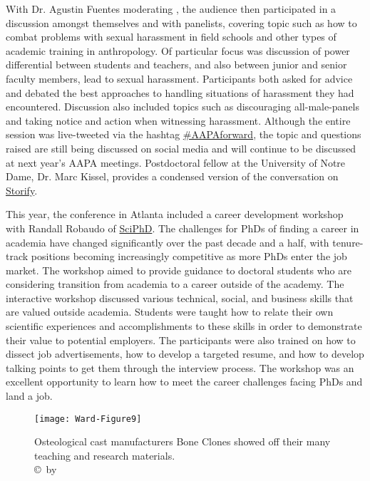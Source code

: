 With Dr. Agustin Fuentes moderating , the audience then participated in a discussion amongst themselves and with panelists,
covering topic such as how to combat problems with sexual harassment in field schools and 
other types of academic training in anthropology. 
Of particular focus was discussion of power differential between students and teachers,
and also between junior and senior faculty members, lead to sexual harassment. 
Participants both asked for advice and debated the best approaches to handling situations of harassment they had encountered.
Discussion also included topics such as discouraging all-male-panels and taking notice and action when witnessing harassment.
Although the entire session was live-tweeted via the hashtag \href{https://twitter.com/search?q=\%23AAPAforward\&src=typd}{\#AAPAforward},
the topic and questions raised are still being discussed on social media and will continue to
be discussed at next year’s AAPA meetings. 
Postdoctoral fellow at the University of Notre Dame, Dr. Marc Kissel, provides a condensed version of the conversation on \href{http://storify.com/MarcKissel/getting-started}{Storify}.

This year, the conference in Atlanta included a career development workshop with Randall Robaudo of \href{http://sciphd.com/}{SciPhD}.
The challenges for PhDs of finding a career in academia have changed significantly over the past decade and a half,
with tenure-track positions becoming increasingly competitive as more PhDs enter the job market. 
The workshop aimed to provide guidance to doctoral students who are considering transition from academia to
a career outside of the academy. 
The interactive workshop discussed various technical, social, and business skills that are valued outside academia.
Students were taught how to relate their own scientific experiences and accomplishments to these skills in order to
demonstrate their value to potential employers. 
The participants were also trained on how to dissect job advertisements, how to develop a targeted resume,
and how to develop talking points to get them through the interview process. 
The workshop was an excellent opportunity to learn how to meet the career challenges facing PhDs and land a job.

	\begin{figure}[!tb] %
		\centering
		\texttt{[image: Ward-Figure9]}
		\caption{Osteological cast manufacturers Bone Clones showed off their many teaching and research materials.
				{\normalfont\scriptsize \\ \copyright\ by \authortwo}}
		\label{fig:Ward-Figure9}
	\end{figure}
	
